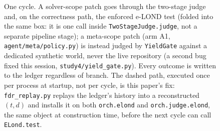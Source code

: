 \documentclass[11pt]{article}
\begin{document}
\begin{figure}[t]
{}
\caption{One cycle. A solver-scope patch goes through the two-stage judge and, on the correctness path, the enforced e-LOND test (folded into the same box: it is one call inside \texttt{TwoStageJudge.judge}, not a separate pipeline stage); a meta-scope patch (arm A1, \texttt{agent/meta/policy.py}) is instead judged by \texttt{YieldGate} against a dedicated synthetic world, never the live repository (a second bug fixed this session, \texttt{study4/yield\_gate.py}). Every outcome is written to the ledger regardless of branch. The dashed path, executed once per process at startup, not per cycle, is this paper's fix: \texttt{fdr\_replay.py} replays the ledger's history into a reconstructed $(t,d)$ and installs it on both \texttt{orch.elond} and \texttt{orch.judge.elond}, the same object at construction time, before the next cycle can call \texttt{ELond.test}.}
\label{fig:arch}
\end{figure}
\end{document}
